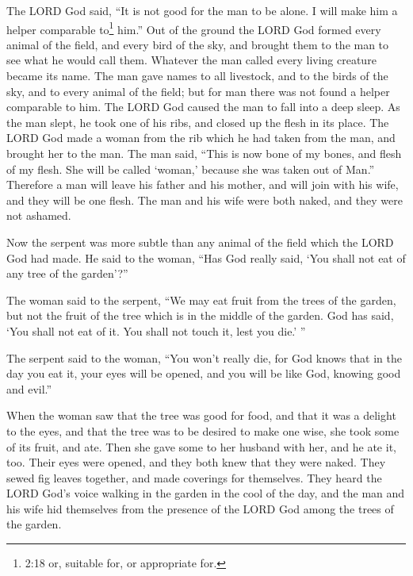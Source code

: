 \myverse{}The LORD God said, “It is not good for the man to be alone. I will make him a helper comparable to\footnote{2:18 or, suitable for, or appropriate for.} him.” \myverse{}Out of the ground the LORD God formed every animal of the field, and every bird of the sky, and brought them to the man to see what he would call them. Whatever the man called every living creature became its name. \myverse{}The man gave names to all livestock, and to the birds of the sky, and to every animal of the field; but for man there was not found a helper comparable to him. \myverse{}The LORD God caused the man to fall into a deep sleep. As the man slept, he took one of his ribs, and closed up the flesh in its place. \myverse{}The LORD God made a woman from the rib which he had taken from the man, and brought her to the man. \myverse{}The man said, “This is now bone of my bones, and flesh of my flesh. She will be called ‘woman,’ because she was taken out of Man.” \myverse{}Therefore a man will leave his father and his mother, and will join with his wife, and they will be one flesh. \myverse{}The man and his wife were both naked, and they were not ashamed.


\mychapter{}
\myverse*{}Now the serpent was more subtle than any animal of the field which the LORD God had made. He said to the woman, “Has God really said, ‘You shall not eat of any tree of the garden’?”

\myverse{}The woman said to the serpent, “We may eat fruit from the trees of the garden, \myverse{}but not the fruit of the tree which is in the middle of the garden. God has said, ‘You shall not eat of it. You shall not touch it, lest you die.’ ”

\myverse{}The serpent said to the woman, “You won’t really die, \myverse{}for God knows that in the day you eat it, your eyes will be opened, and you will be like God, knowing good and evil.”

\myverse{}When the woman saw that the tree was good for food, and that it was a delight to the eyes, and that the tree was to be desired to make one wise, she took some of its fruit, and ate. Then she gave some to her husband with her, and he ate it, too. \myverse{}Their eyes were opened, and they both knew that they were naked. They sewed fig leaves together, and made coverings for themselves. \myverse{}They heard the LORD God’s voice walking in the garden in the cool of the day, and the man and his wife hid themselves from the presence of the LORD God among the trees of the garden.

